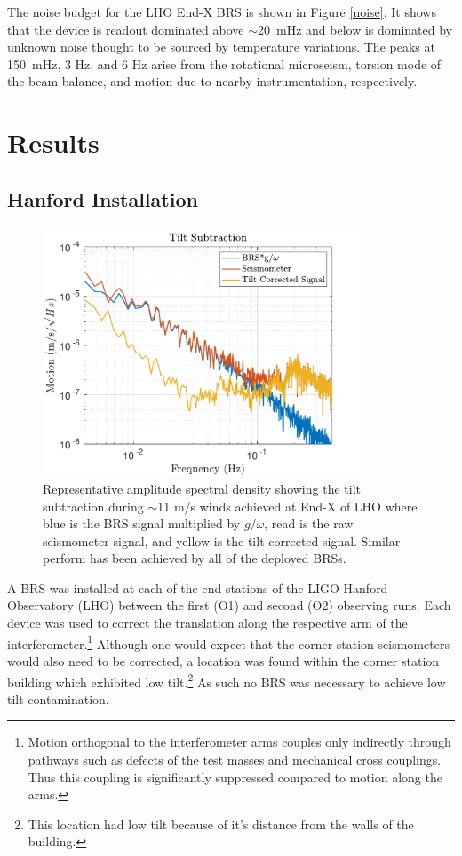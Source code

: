 \documentclass [12pt, proquest]{uwthesis}[2019]
\begin{document}
 The noise budget for the LHO End-X BRS is shown in Figure \ref{noise}. It shows that the device is readout dominated above $\sim$20~mHz and below is dominated by unknown noise thought to be sourced by temperature variations. The peaks at 150~mHz, 3 Hz, and 6 Hz arise from the rotational microseism, torsion mode of the beam-balance, and motion due to nearby instrumentation, respectively.

\section{Results}\label{results}
\subsection{Hanford Installation} \label{BRS_Hanford}

\begin{figure}[!h]
\begin{center}
\includegraphics[width=0.85\textwidth]{TiltCorrSpec.pdf}
\caption[Representative amplitude spectral density showing the tilt subtraction during windy conditions]{Representative amplitude spectral density showing the tilt subtraction during $\sim$11 m/s winds achieved at End-X of LHO where blue is the BRS signal multiplied by $g/\omega$, read is the raw seismometer signal, and yellow is the tilt corrected signal. Similar perform has been achieved by all of the deployed BRSs.}
\label{sub}
\end{center}
\end{figure}

\quad A BRS was installed at each of the end stations of the LIGO Hanford Observatory (LHO) between the first (O1) and second (O2) observing runs. Each device was used to correct the translation along the respective arm of the interferometer.\footnote{Motion orthogonal to the interferometer arms couples only indirectly through pathways such as defects of the test masses and mechanical cross couplings. Thus this coupling is significantly suppressed compared to motion along the arms.} Although one would expect that the corner station seismometers would also need to be corrected, a location was found within the corner station building which exhibited low tilt.\footnote{This location had low tilt because of it's distance from the walls of the building.} As such no BRS was necessary to achieve low tilt contamination.
\end{document}
